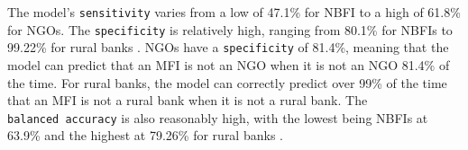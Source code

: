 \documentclass[a4paper,nobind]{templates/ociamthesis}
\newenvironment{Shaded}{\begin{snugshade}}{\end{snugshade}}
\newcommand{\DecValTok}[1]{\textcolor[rgb]{0.00,0.00,0.81}{#1}}
\newcommand{\DocumentationTok}[1]{\textcolor[rgb]{0.56,0.35,0.01}{\textbf{\textit{#1}}}}
\newcommand{\FloatTok}[1]{\textcolor[rgb]{0.00,0.00,0.81}{#1}}
\newcommand{\FunctionTok}[1]{\textcolor[rgb]{0.00,0.00,0.00}{#1}}
\newcommand{\NormalTok}[1]{#1}
\newcommand{\OtherTok}[1]{\textcolor[rgb]{0.56,0.35,0.01}{#1}}
\newcommand{\SpecialCharTok}[1]{\textcolor[rgb]{0.00,0.00,0.00}{#1}}
\newcommand{\StringTok}[1]{\textcolor[rgb]{0.31,0.60,0.02}{#1}}
\renewenvironment{Shaded}
{
  \vspace{10pt}%
  \begin{snugshade}%
}{%
  \end{snugshade}%
  \vspace{8pt}%
}
\begin{document}
The model's \texttt{sensitivity} varies from a low of 47.1\% for NBFI to a high of 61.8\% for NGOs. The \texttt{specificity} is relatively high, ranging from 80.1\% for NBFIs to 99.22\% for rural banks \autocite{ginting2019hate}. NGOs have a \texttt{specificity} of 81.4\%, meaning that the model can predict that an MFI is not an NGO when it is not an NGO 81.4\% of the time. For rural banks, the model can correctly predict over 99\% of the time that an MFI is not a rural bank when it is not a rural bank. The \texttt{balanced\ accuracy} is also reasonably high, with the lowest being NBFIs at 63.9\% and the highest at 79.26\% for rural banks \autocite{hedeker2003mixed}.

\begin{Shaded}
\end{Shaded}
\end{document}
